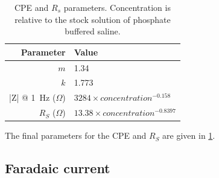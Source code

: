      \begin{table}
        \centering
        \begin{tabular}{r | l}
          Parameter & Value \\
          \hline
          $m$& 1.34\\
          $k$ & 1.773\\
          |Z| @ \SI{1}{\hertz} ($\Omega$)& $3284 \times concentration^{-0.158}$ \\
          $R_{S}$ ($\Omega$)& $13.38 \times concentration^{-0.8397}$
        \end{tabular}
        \caption{\label{tab:CPEparams}CPE and $R_{s}$ parameters. Concentration is relative to the stock solution of phosphate buffered saline.}
      \end{table}
      The final parameters for the CPE and $R_{S}$ are given in \cref{tab:CPEparams}.



    \subsection{Faradaic current}
      \label{sect:pt2-faradaicCurrent_PBS}

